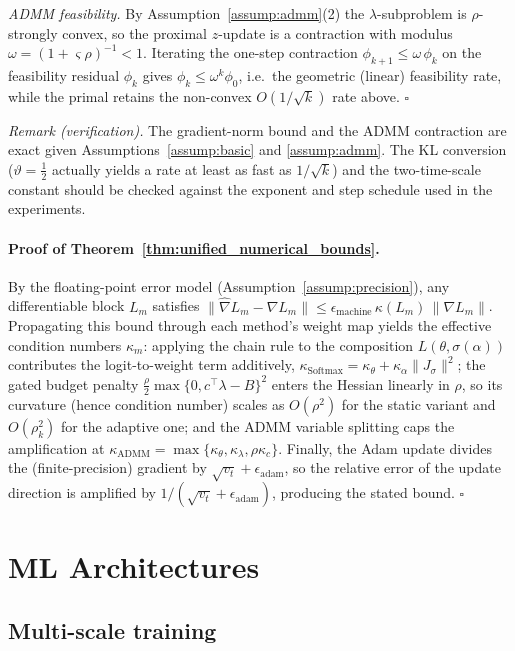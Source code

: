 \documentclass[preprint,12pt,authoryear]{elsarticle}
\begin{document}
{\emph{ADMM feasibility.} By Assumption~\ref{assump:admm}(2) the $\lambda$-subproblem is $\rho$-strongly convex, so the proximal $z$-update is a contraction with modulus $\omega=(1+\varsigma\rho)^{-1}<1$. Iterating the one-step contraction $\phi_{k+1}\le\omega\,\phi_k$ on the feasibility residual $\phi_k$ gives $\phi_k\le\omega^k\phi_0$, i.e.\ the geometric (linear) feasibility rate, while the primal retains the non-convex $O(1/\sqrt{k})$ rate above. \hfill$\square$

\emph{Remark (verification).} The gradient-norm bound and the ADMM contraction are exact given Assumptions~\ref{assump:basic} and \ref{assump:admm}. The KL conversion ($\vartheta=\tfrac12$ actually yields a rate at least as fast as $1/\sqrt{k}$) and the two-time-scale constant should be checked against the exponent and step schedule used in the experiments.

\paragraph{Proof of Theorem~\ref{thm:unified_numerical_bounds}.}
By the floating-point error model (Assumption~\ref{assump:precision}), any differentiable block $L_m$ satisfies $\|\hat{\nabla} L_m-\nabla L_m\|\le\epsilon_{\text{machine}}\,\kappa(L_m)\,\|\nabla L_m\|$. Propagating this bound through each method's weight map yields the effective condition numbers $\kappa_m$: applying the chain rule to the composition $L(\theta,\sigma(\alpha))$ contributes the logit-to-weight term additively, $\kappa_{\text{Softmax}}=\kappa_\theta+\kappa_\alpha\|J_\sigma\|^2$; the gated budget penalty $\tfrac{\rho}{2}\max\{0,c^\top\lambda-B\}^2$ enters the Hessian linearly in $\rho$, so its curvature (hence condition number) scales as $O(\rho^2)$ for the static variant and $O(\rho_k^2)$ for the adaptive one; and the ADMM variable splitting caps the amplification at $\kappa_{\text{ADMM}}=\max\{\kappa_\theta,\kappa_\lambda,\rho\kappa_c\}$. Finally, the Adam update divides the (finite-precision) gradient by $\sqrt{v_t}+\epsilon_{\text{adam}}$, so the relative error of the update direction is amplified by $1/(\sqrt{v_t}+\epsilon_{\text{adam}})$, producing the stated bound. \hfill$\square$
}

\section{ML Architectures}

\subsection{Multi-scale training}
\end{document}

